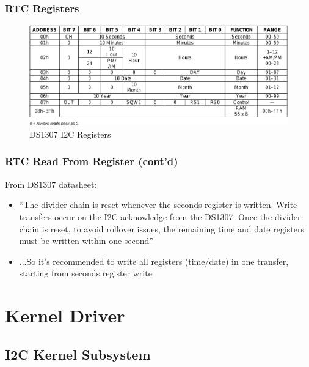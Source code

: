 \begin{frame}
  \frametitle{RTC Registers}
  \begin{figure}
    \centering
    \includegraphics[scale=0.3]{images/rtc-registers.png}
    \caption{DS1307 I2C Registers}
  \end{figure}
\end{frame}

\begin{frame}
  \frametitle{RTC Read From Register (cont'd)}
  From DS1307 datasheet:
  \begin{itemize}
    \item ``The divider chain is reset whenever the seconds register is written. Write transfers
occur on the I2C acknowledge from the DS1307. Once the divider chain is reset,
to avoid rollover issues, the remaining time and date registers must be written within one second''
    \item ...So it's recommended to write all registers (time/date) in one transfer, starting from seconds register write
  \end{itemize}
\end{frame}


\section{Kernel Driver}

\subsection{I2C Kernel Subsystem}

